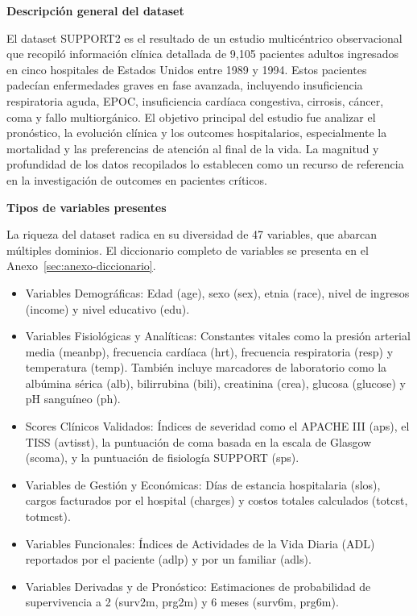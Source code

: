 \textbf{Descripción general del dataset}

El dataset SUPPORT2 es el resultado de un estudio multicéntrico observacional
que recopiló información clínica detallada de 9,105 pacientes adultos ingresados
en cinco hospitales de Estados Unidos entre 1989 y 1994. Estos pacientes
padecían enfermedades graves en fase avanzada, incluyendo insuficiencia
respiratoria aguda, EPOC, insuficiencia cardíaca congestiva, cirrosis, cáncer,
coma y fallo multiorgánico. El objetivo principal del estudio fue analizar el
pronóstico, la evolución clínica y los outcomes hospitalarios, especialmente la
mortalidad y las preferencias de atención al final de la vida. La magnitud y
profundidad de los datos recopilados lo establecen como un recurso de referencia
en la investigación de outcomes en pacientes críticos.

\textbf{Tipos de variables presentes}

La riqueza del dataset radica en su diversidad de 47 variables, que abarcan
múltiples dominios. El diccionario completo de variables se presenta en el
Anexo~\ref{sec:anexo-diccionario}.

\begin{itemize}
  \item Variables Demográficas: Edad (age), sexo (sex), etnia (race), nivel de
    ingresos (income) y nivel educativo (edu).
  \item Variables Fisiológicas y Analíticas: Constantes vitales como la presión
    arterial media (meanbp), frecuencia cardíaca (hrt), frecuencia respiratoria
    (resp) y temperatura (temp). También incluye marcadores de laboratorio como
    la albúmina sérica (alb), bilirrubina (bili), creatinina (crea), glucosa
    (glucose) y pH sanguíneo (ph).
  \item Scores Clínicos Validados: Índices de severidad como el APACHE III (aps), el
    TISS (avtisst), la puntuación de coma basada en la escala de Glasgow
    (scoma), y la puntuación de fisiología SUPPORT (sps).
  \item Variables de Gestión y Económicas: Días de estancia hospitalaria (slos),
    cargos facturados por el hospital (charges) y costos totales calculados
    (totcst, totmcst).
  \item Variables Funcionales: Índices de Actividades de la Vida Diaria (ADL)
    reportados por el paciente (adlp) y por un familiar (adls).
  \item Variables Derivadas y de Pronóstico: Estimaciones de probabilidad de
    supervivencia a 2 (surv2m, prg2m) y 6 meses (surv6m, prg6m).
\end{itemize}

